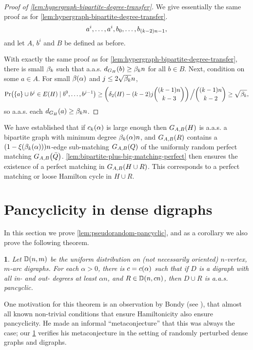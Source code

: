 \documentclass[11pt,english]{article}
\theoremstyle{plain}
\newtheorem{thm}{\protect\theoremname}
\theoremstyle{definition}
\theoremstyle{definition}
\theoremstyle{plain}
\theoremstyle{plain}
\theoremstyle{plain}
\theoremstyle{plain}
\theoremstyle{remark}
\theoremstyle{remark}
\let\originalleft\left
\let\originalright\right
\renewcommand{\left}{\mathopen{}\mathclose\bgroup\originalleft}
\renewcommand{\right}{\aftergroup\egroup\originalright}
\providecommand{\theoremname}{Theorem}
\begin{document}
\begin{proof}
[Proof of \ref{lem:hypergraph-bipartite-degree-transfer}]We give
essentially the same proof as for \ref{lem:hypergraph-bipartite-degree-transfer}.
\[
a^{i},\dots,a^{i},b_{0},\dots,b_{\left(k-2\right)n-1},
\]
and let $A$, $b^i$ and $B$ be defined as before.

With exactly the same proof as for \ref{lem:hypergraph-bipartite-degree-transfer},
there is small $\beta_k$ such that a.a.s. $d_{G_{H}}\left(b\right)\ge\aham n$
for all $b\in B$. Next, condition on some $a\in A$. For small $\beta\left(\alpha\right)$
and $j\le2\sqrt{\beta_k}n$,
\[
\Pr\left(\left\{ a\right\} \cup b^{j}\in E\left(H\right)\mid b^{0},\dots,b^{j-1}\right)\ge\left(\delta_{2}\left(H\right)-\left(k-2\right)j{\left(k-1\right)n \choose k-3}\right)\left.\vphantom{\sum}\right/{ \left(k-1\right)n \choose k-2}\ge\sqrt{\aham},
\]
so a.a.s. each $d_{G_{H}}\left(a\right)\ge\aham n$.
\end{proof}
We have established that if $\chyp\left(\alpha\right)$ 
is large enough then $G_{A,B}\left(H\right)$ is a.a.s. a bipartite graph with minimum degree $\a\left(\alpha\right)n$, and $G_{A,B}\left(R\right)$ contains a $\left(1-\xi\left(\a\left(\alpha\right)\right)\right)n$-edge sub-matching $G_{A,B}\left(Q\right)$ of the uniformly random perfect matching $G_{A,B}\left(\bar{Q}\right)$. \ref{lem:bipartite-plus-big-matching-perfect} then
ensures the existence of a perfect matching in $G_{A,B}\left(H\cup R\right)$. This corresponds to a perfect matching or loose Hamilton cycle in $H\cup R$.


\section{\label{sec:digraphs}Pancyclicity in dense digraphs}

In this section we prove \ref{lem:pseudorandom-pancyclic}, and as
a corollary we also prove the following theorem.
\begin{thm}
\label{thm:smoothed-pancyclic}Let $\DD\left(n,m\right)$ be the uniform
distribution on (not necessarily oriented) $n$-vertex, $m$-arc digraphs.
For each $\alpha>0$, there is $\cdi=\cdi\left(\alpha\right)$ such that
if $D$ is a digraph with all in- and out- degrees at least $\alpha n$,
and $R\in\DD\left(n,\cdi n\right)$, then $D\cup R$
is a.a.s. pancyclic.
\end{thm}
One motivation for this theorem is an observation by Bondy (see \cite{Bon75}),
that almost all known non-trivial conditions that ensure Hamiltonicity
also ensure pancyclicity. He made an informal ``metaconjecture''
that this was always the case; our \ref{thm:smoothed-pancyclic} verifies
his metaconjecture in the setting of randomly perturbed dense graphs
and digraphs.
\end{document}

